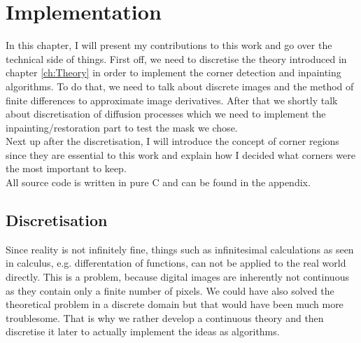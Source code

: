 \chapter{Implementation}\label{ch:Implementation} 
In this chapter, I will present my contributions to this work and go over the technical side of
things. First off, we need to discretise the theory introduced in chapter \ref{ch:Theory} in order
to implement the corner detection and inpainting algorithms. To do that, we need to talk about
discrete images and the method of finite differences to approximate image derivatives.
After that we shortly talk about discretisation of diffusion processes which we need to implement
the inpainting/restoration part to test the mask we chose.\\  
Next up after the discretisation, I will introduce the concept of corner regions since they are
essential to this work and explain how I decided what corners were the most important to keep.\\
All source code is written in pure C and can be found in the appendix.
\section{Discretisation}

Since reality is not infinitely fine, things such as infinitesimal calculations as seen in 
calculus, e.g. differentation of functions, can not be applied to the real world directly.
This is a problem, because digital images are inherently not continuous as they contain only a
finite number of pixels. 
We could have also solved the theoretical problem in a discrete domain but that would have 
been much more troublesome.
That is why we rather develop a continuous theory and then discretise it later to actually
implement the ideas as algorithms.

